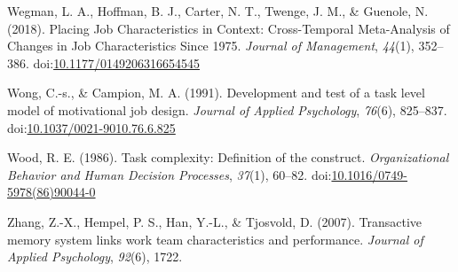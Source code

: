 \documentclass[english,,man]{apa6}
\theoremstyle{definition}
\theoremstyle{definition}
\theoremstyle{definition}
\theoremstyle{remark}
\begin{document}
\leavevmode\hypertarget{ref-wegman_placing_2018}{}%
Wegman, L. A., Hoffman, B. J., Carter, N. T., Twenge, J. M., \& Guenole,
N. (2018). Placing Job Characteristics in Context: Cross-Temporal
Meta-Analysis of Changes in Job Characteristics Since 1975.
\emph{Journal of Management}, \emph{44}(1), 352--386.
doi:\href{https://doi.org/10.1177/0149206316654545}{10.1177/0149206316654545}

\leavevmode\hypertarget{ref-wong_development_1991}{}%
Wong, C.-s., \& Campion, M. A. (1991). Development and test of a task
level model of motivational job design. \emph{Journal of Applied
Psychology}, \emph{76}(6), 825--837.
doi:\href{https://doi.org/10.1037/0021-9010.76.6.825}{10.1037/0021-9010.76.6.825}

\leavevmode\hypertarget{ref-wood_task_1986}{}%
Wood, R. E. (1986). Task complexity: Definition of the construct.
\emph{Organizational Behavior and Human Decision Processes},
\emph{37}(1), 60--82.
doi:\href{https://doi.org/10.1016/0749-5978(86)90044-0}{10.1016/0749-5978(86)90044-0}

\leavevmode\hypertarget{ref-zhang2007transactive}{}%
Zhang, Z.-X., Hempel, P. S., Han, Y.-L., \& Tjosvold, D. (2007).
Transactive memory system links work team characteristics and
performance. \emph{Journal of Applied Psychology}, \emph{92}(6), 1722.
\end{document}
